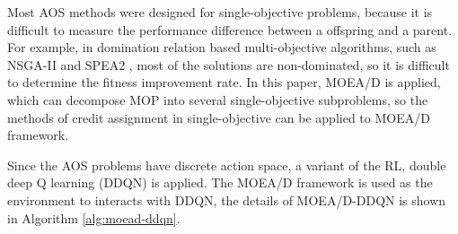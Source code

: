 \documentclass[journal]{IEEEtran}
\begin{document}
Most AOS methods were designed for single-objective problems, because it is difficult to measure the performance difference between a offspring and a parent.
For example, in domination relation based multi-objective algorithms, such as NSGA-II \cite{nsga2} and SPEA2 \cite{spea2}, most of the solutions are non-dominated, so it is difficult to determine the fitness improvement rate.
In this paper, MOEA/D is applied, which can decompose MOP into several single-objective subproblems, so the methods of credit assignment in single-objective can be applied to MOEA/D framework.

Since the AOS problems have discrete action space, a variant of the RL, double deep Q learning (DDQN) is applied.
The MOEA/D framework is used as the environment to interacts with DDQN,
the details of MOEA/D-DDQN is shown in Algorithm \ref{alg:moead-ddqn}.
\end{document}

